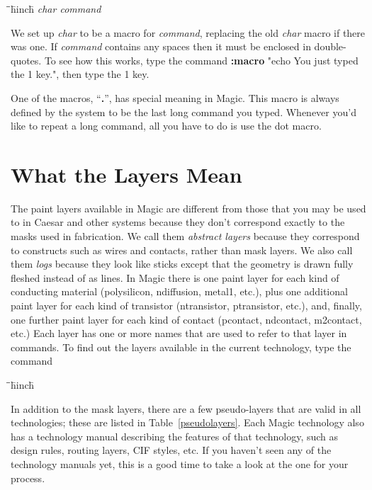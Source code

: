 \documentclass[letterpaper,twoside,12pt]{article}
\def\hinch{\hspace*{0.5in}}
\def\starti{\begin{center}\begin{tabbing}\hinch\=\hinch\=\hinch\=hinch\=\kill}
\def\endi{\end{tabbing}\end{center}}
\def\ii{\>\>\>}
\begin{document}
\starti
  \ii {\bfseries :macro} {\itshape char command}
\endi

We set up {\itshape char} to be a macro for {\itshape command}, replacing the old
{\itshape char} macro if there was one.  If {\itshape command} contains any spaces
then it must be enclosed in double-quotes.  To see how this works, type
the command {\bfseries :macro} { "echo You just typed the 1 key."},
then type the 1 key.

One of the macros, ``{\bfseries .}'', has special meaning in Magic.  This
macro is always defined by the system to be the last long command
you typed.  Whenever you'd like to repeat a long command, all you
have to do is use the dot macro.

\section{What the Layers Mean}

The paint layers available in Magic are different from those
that you may be used to in Caesar and other systems because
they don't correspond
exactly to the masks used in fabrication.  We call them
{\itshape abstract layers} because they correspond to constructs
such as wires and contacts, rather than mask layers.  We
also call them {\itshape logs} because they look like sticks
except that the geometry is drawn fully fleshed instead of
as lines. In Magic there
is one paint layer for each kind of conducting material
(polysilicon, ndiffusion, metal1, etc.),
plus one additional paint layer for each kind of transistor
(ntransistor, ptransistor, etc.), and, finally, one further
paint layer for each kind of contact (pcontact, ndcontact,
m2contact, etc.) Each
layer has one or more names that are
used to refer to that layer in commands.  To find out the
layers available in the current technology, type the command

\starti
   \ii {\bfseries :layers}
\endi

In addition to the mask layers, there are a few pseudo-layers
that are valid in all technologies;  these are listed in
Table~\ref{pseudolayers}.
Each Magic technology also has a technology manual describing
the features of that technology, such as design rules, routing
layers, CIF styles, etc.  If you haven't seen any of the technology
manuals yet, this is a good time to take a look at the one for
your process.
\end{document}
